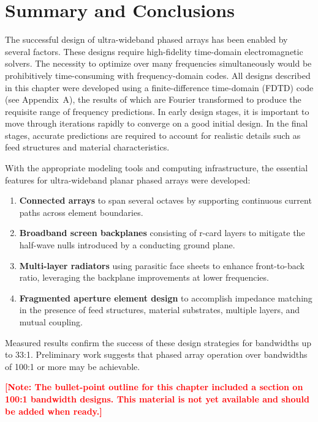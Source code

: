 \section{Summary and Conclusions}

The successful design of ultra-wideband phased arrays has been enabled by several factors.  These designs require high-fidelity time-domain electromagnetic solvers.  The necessity to optimize over many frequencies simultaneously would be prohibitively time-consuming with frequency-domain codes.  All designs described in this chapter were developed using a finite-difference time-domain (FDTD) code (see Appendix~A), the results of which are Fourier transformed to produce the requisite range of frequency predictions.  In early design stages, it is important to move through iterations rapidly to converge on a good initial design.  In the final stages, accurate predictions are required to account for realistic details such as feed structures and material characteristics.

With the appropriate modeling tools and computing infrastructure, the essential features for ultra-wideband planar phased arrays were developed:

\begin{enumerate}
\item \textbf{Connected arrays} to span several octaves by supporting continuous current paths across element boundaries.
\item \textbf{Broadband screen backplanes} consisting of r-card layers to mitigate the half-wave nulls introduced by a conducting ground plane.
\item \textbf{Multi-layer radiators} using parasitic face sheets to enhance front-to-back ratio, leveraging the backplane improvements at lower frequencies.
\item \textbf{Fragmented aperture element design} to accomplish impedance matching in the presence of feed structures, material substrates, multiple layers, and mutual coupling.
\end{enumerate}

Measured results confirm the success of these design strategies for bandwidths up to 33:1.  Preliminary work suggests that phased array operation over bandwidths of 100:1 or more may be achievable.

\textcolor{red}{\textbf{[Note: The bullet-point outline for this chapter included a section on 100:1 bandwidth designs.  This material is not yet available and should be added when ready.]}}

